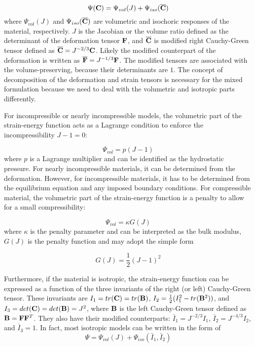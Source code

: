 \begin{equation} \label{energy_split}
\Psi(\bold{C}) = \Psi_{vol}(J) + \Psi_{iso}(\overline{\bold{C}})
\end{equation}
where $\Psi_{vol}(J)$ and $\Psi_{iso}(\overline{\bold{C}})$ are volumetric and isochoric responses of the material, respectively. $J$ is the Jacobian or the volume ratio defined as the determinant of the deformation tensor $\bold{F}$, and $\overline{\bold{C}}$ is modified right Cauchy-Green tensor defined as 
$\overline{\bold{C}}  = J^{-2/3} \bold{C}$. Likely the modified counterpart of the deformation is written as $\overline{\bold{F}} = J^{-1/3} \bold{F}$. The modified tensors are associated with the volume-preserving, because their determinants are $1$. The concept of decomposition of the deformation and strain tensors is necessary for the mixed formulation because we need to deal with the volumetric and isotropic parts differently.

For incompressible or nearly incompressible models, the volumetric part of the strain-energy function acts as a Lagrange condition to enforce the incompressibility $J -1 = 0$:

\begin{equation} \label{Lagrange}
\Psi_{vol} = p(J-1)
\end{equation} 
where $p$ is a Lagrange multiplier and can be identified as the hydrostatic pressure. For nearly incompressible materials, it can be determined from the deformation. However, for incompressible materials, it has to be determined from the equilibrium equation and any imposed boundary conditions. For compressible material, the volumetric part of the strain-energy function is a penalty to allow for a small compressibility:

\begin{equation} \label{penalty}
\Psi_{vol} = \kappa G(J)
\end{equation}
where $\kappa$ is the penalty parameter and can be interpreted as the bulk modulus, $G(J)$ is the penalty function and may adopt the simple form

\begin{equation} \label{penalty2}
G(J) = \frac{1}{2}(J - 1)^2
\end{equation}

Furthermore, if the material is isotropic, the strain-energy function can be expressed as a function of the three invariants of the right (or left) Cauchy-Green tensor. 
These invariants are 
$I_1 = tr(\bold{C}) = tr(\bold{B})$, $I_2 = \frac{1}{2}(I_1^2 - tr(\bold{B}^2))$, and $I_3 = det(\bold{C}) = det(\bold{B}) = J^2$, where $\bold{B}$ is the left Cauchy-Green tensor defined as $\bold{B} = \bold{F}{\bold{F}}^T$. 
They also have their modified counterparts: $\bar{I}_1 = J^{-2/3}I_1$, $\bar{I}_2 = J^{-4/3}I_2$, and $\bar{I}_3 = 1$. In fact, most isotropic models can be written in the form of
\begin{equation}
\Psi = \Psi_{vol}(J) + \Psi_{iso}(\bar{I}_1, \bar{I}_2)
\end{equation}


